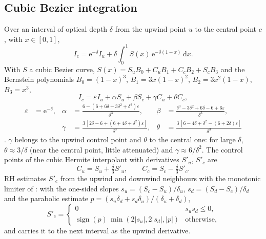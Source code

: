 \documentclass[11pt,a4paper]{article}
\newcommand{\dd}{\mathrm{d}}
\newcommand{\e}{\mathrm{e}}
\begin{document}
\subsection{Cubic Bezier integration}
\label{sec:bezier}
Over an interval of optical depth $\delta$ from the upwind point $u$ to
the central point $c$, with $x\in[0,1]$,
\begin{equation}
I_c = \e^{-\delta}I_u + \delta\int_0^1 S(x)\,\e^{-\delta(1-x)}\,\dd x .
\end{equation}
With $S$ a cubic Bezier curve,
$S(x) = S_u B_0 + C_u B_1 + C_c B_2 + S_c B_3$ and the Bernstein
polynomials $B_0 = (1-x)^3$, $B_1 = 3x(1-x)^2$, $B_2 = 3x^2(1-x)$,
$B_3 = x^3$,
\begin{equation}
I_c = \varepsilon I_u + \alpha S_u + \beta S_c + \gamma C_u + \theta C_c,
\end{equation}
\begin{equation}
\begin{aligned}
\varepsilon &= \e^{-\delta}, &
\alpha &= \frac{6-(6+6\delta+3\delta^2+\delta^3)\varepsilon}{\delta^3}, &
\beta  &= \frac{\delta^3-3\delta^2+6\delta-6+6\varepsilon}{\delta^3},\\
&& \gamma &= \frac{3\,[2\delta-6+(6+4\delta+\delta^2)\varepsilon]}{\delta^3}, &
\theta &= \frac{3\,[6-4\delta+\delta^2-(6+2\delta)\varepsilon]}{\delta^3}
\end{aligned}
\end{equation}
\citep{2013ApJ...764...33D}. $\gamma$ belongs to the
upwind control point and $\theta$ to the central one: for large
$\delta$, $\theta\approx3/\delta$ (near the central point, little
attenuated) and $\gamma\approx6/\delta^2$. The control points of the
cubic Hermite interpolant with derivatives $S'_u$, $S'_c$ are
\begin{equation}
C_u = S_u + \tfrac{\delta}{3}S'_u,\qquad C_c = S_c - \tfrac{\delta}{3}S'_c .
\end{equation}
RH estimates $S'_c$ from the upwind and downwind neighbours with
the monotonic limiter of \citet{1990A&A...239..443S}: with the one-sided slopes
$s_u = (S_c-S_u)/\delta_u$, $s_d = (S_d-S_c)/\delta_d$ and the parabolic
estimate $p = (s_u\delta_d+s_d\delta_u)/(\delta_u+\delta_d)$,
\begin{equation}
S'_c = \begin{cases}0 & s_us_d\le0,\\
\operatorname{sign}(p)\,\min(2|s_u|,2|s_d|,|p|) & \text{otherwise},
\end{cases}
\end{equation}
and carries it to the next interval as the upwind derivative.
\end{document}
